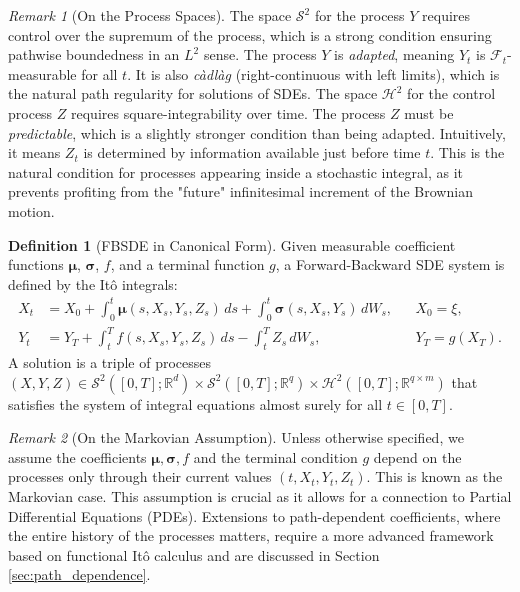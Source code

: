 \documentclass[11pt,letterpaper,oneside]{article}
\theoremstyle{plain}
\theoremstyle{definition}
\newtheorem{definition}[theorem]{Definition}
\theoremstyle{remark}
\newtheorem{remark}{Remark}[section]
\begin{document}
\begin{remark}[On the Process Spaces]
The space \(\mathcal{S}^2\) for the process \(Y\) requires control over the supremum of the process, which is a strong condition ensuring pathwise boundedness in an \(L^2\) sense. The process \(Y\) is \emph{adapted}, meaning \(Y_t\) is \(\mathcal{F}_t\)-measurable for all \(t\). It is also \emph{c\`adl\`ag} (right-continuous with left limits), which is the natural path regularity for solutions of SDEs. The space \(\mathcal{H}^2\) for the control process \(Z\) requires square-integrability over time. The process \(Z\) must be \emph{predictable}, which is a slightly stronger condition than being adapted. Intuitively, it means \(Z_t\) is determined by information available just before time \(t\). This is the natural condition for processes appearing inside a stochastic integral, as it prevents profiting from the "future" infinitesimal increment of the Brownian motion.
\end{remark}

\begin{definition}[FBSDE in Canonical Form]
\label{def:FBSDE}
Given measurable coefficient functions \(\bm\mu\), \(\bm\sigma\), \(f\), and a terminal function \(g\), a Forward-Backward SDE system is defined by the Itô integrals:
\begin{align}\label{eq:FBSDE_canonical}
  X_t &= X_0 + \int_0^t \bm\mu(s,X_s,Y_s,Z_s)\,ds
        + \int_0^t \bm\sigma(s,X_s,Y_s)\,dW_s, && X_0=\xi, \\
  Y_t &= Y_T + \int_t^T f(s,X_s,Y_s,Z_s)\,ds - \int_t^T Z_s\,dW_s, && Y_T=g(X_T).
\end{align}
A solution is a triple of processes \((X,Y,Z)\in \mathcal S^2([0,T];\mathbb{R}^d) \times \mathcal S^2([0,T];\mathbb{R}^q) \times \mathcal H^2([0,T];\mathbb{R}^{q \times m})\) that satisfies the system of integral equations almost surely for all $t \in [0,T]$.
\end{definition}

\begin{remark}[On the Markovian Assumption]
Unless otherwise specified, we assume the coefficients \(\bm\mu, \bm\sigma, f\) and the terminal condition \(g\) depend on the processes only through their current values \((t, X_t, Y_t, Z_t)\). This is known as the Markovian case. This assumption is crucial as it allows for a connection to Partial Differential Equations (PDEs). Extensions to path-dependent coefficients, where the entire history of the processes matters, require a more advanced framework based on functional Itô calculus and are discussed in Section \ref{sec:path_dependence}.
\end{remark}
\end{document}
